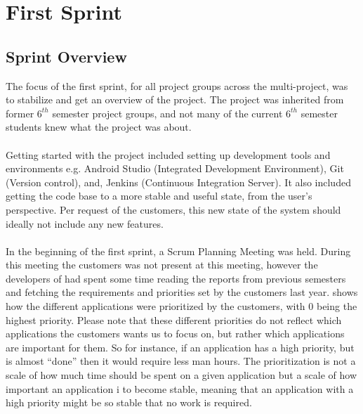 \part{First Sprint}
\label{par:first_sprint}

\chapter{Sprint Overview}
The focus of the first sprint, for all project groups across the multi-project, was to stabilize and get an overview of the project. The project was inherited from former $6^{th}$ semester project groups, and not many of the current $6^{th}$ semester students knew what the \giraf project was about.
\\\\
Getting started with the project included setting up development tools and environments e.g. Android Studio (Integrated Development Environment), Git (Version control), and, Jenkins (Continuous Integration Server). It also included getting the code base to a more stable and useful state, from the user's perspective. Per request of the customers, this new state of the system should ideally not include any new features.
\\\\
In the beginning of the first sprint, a Scrum Planning Meeting was held. During this meeting the customers was not present at this meeting, however the developers of \giraf had spent some time reading the reports from previous semesters and fetching the requirements and priorities set by the customers last year.  shows how the different applications were prioritized by the customers, with 0 being the highest priority. Please note that these different priorities do not reflect which applications the customers wants us to focus on, but rather which applications are important for them. So for instance, if an application has a high priority, but is almost ``done'' then it would require less man hours. The prioritization is not a scale of how much time should be spent on a given application but a scale of how important an application i to become stable, meaning that an application with a high priority might be so stable that no work is required. 


